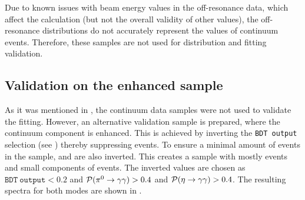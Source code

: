 Due to known issues with beam energy values in the off-resonance data, which affect the \Mbc calculation (but not the overall validity of other values), 
the \epem\ra\qqbar off-resonance \Mbc distributions do not accurately represent the \Mbc values of continuum events.
Therefore, these samples are not used for \Mbc distribution and \Mbc fitting validation.

\subsection{Validation on the \texorpdfstring{\epem\ra\qqbar}{e+e- -> qqbar} enhanced sample}\label{sec:continuum_mbc_validation}

As it was mentioned in ,
the continuum data samples were not used to validate the \Mbc fitting.
However, an alternative validation sample is prepared, where the continuum component is enhanced.
This is achieved by inverting the \texttt{BDT~output} selection (see ) thereby suppressing \BB events.
To ensure a minimal amount of \BtoXsgamma events in the sample, \piVeto and \etaVeto
are also inverted.
This creates a sample with mostly \epem\ra\qqbar events and small components of \BB events.
The inverted values are chosen as $\mathtt{BDT~output}<0.2$ and ${\mathcal{P}(\pi^0\rightarrow\gamma\gamma)}>0.4$ and ${\mathcal{P}(\eta\rightarrow\gamma\gamma)}>0.4$.
The resulting \EB spectra for both \FEI modes are shown in .
